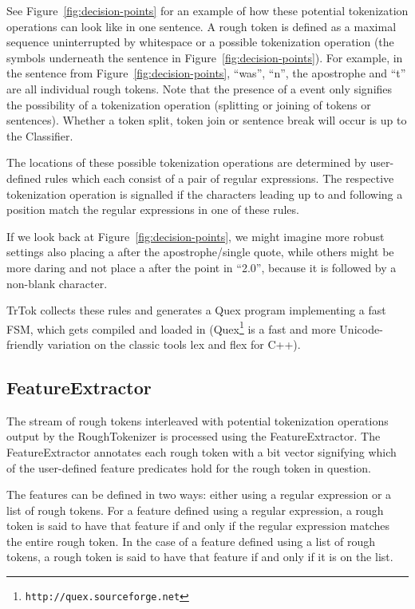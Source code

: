 See Figure~\ref{fig:decision-points} for an example of how these
potential tokenization operations can look like in one sentence. A
rough token is defined as a maximal sequence uninterrupted by
whitespace or a possible tokenization operation (the symbols
underneath the sentence in Figure~\ref{fig:decision-points}). For
example, in the sentence from Figure~\ref{fig:decision-points},
``was'', ``n'', the apostrophe and ``t'' are all individual rough
tokens. Note that the presence of a \may{} event only signifies the
possibility of a tokenization operation (splitting or joining of
tokens or sentences). Whether a token split, token join or sentence
break will occur is up to the Classifier.

The locations of these possible tokenization operations are determined
by user-defined rules which each consist of a pair of regular
expressions. The respective tokenization operation is signalled if the
characters leading up to and following a position match the regular
expressions in one of these rules.

If we look back at Figure~\ref{fig:decision-points}, we might imagine
more robust settings also placing a \maybreaksentence{} after the
apostrophe/single quote, while others might be more daring and not
place a \maybreaksentence{} after the point in ``2.0'', because it is
followed by a non-blank character.

TrTok collects these rules and generates a Quex program implementing a
fast FSM, which gets compiled and loaded in
(Quex\footnote{\texttt{http://quex.sourceforge.net}} is a fast and
more Unicode-friendly variation on the classic tools lex and flex for
C++).

\subsection{FeatureExtractor}

The stream of rough tokens interleaved with potential tokenization
operations output by the RoughTokenizer is processed using the
FeatureExtractor. The FeatureExtractor annotates each rough token with
a bit vector signifying which of the user-defined feature predicates
hold for the rough token in question.

The features can be defined in two ways: either using a regular
expression or a list of rough tokens. For a feature defined using a
regular expression, a rough token is said to have that feature if and
only if the regular expression matches the entire rough token. In the
case of a feature defined using a list of rough tokens, a rough token
is said to have that feature if and only if it is on the list.

